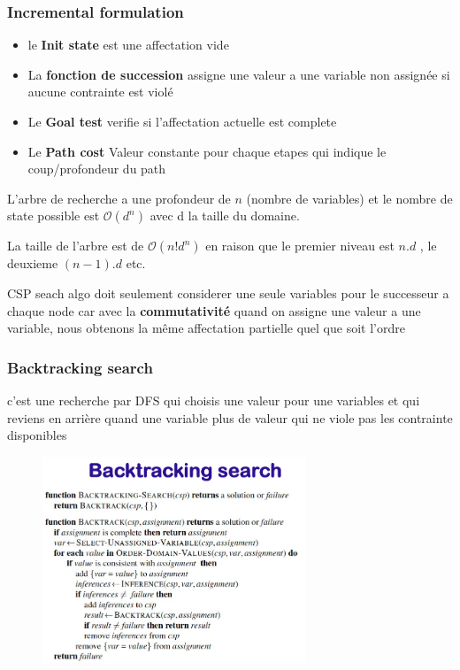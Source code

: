 		\subsubsection{Incremental formulation}
			\begin{itemize}
				\item le \textbf{Init state} est une affectation vide
				\item La \textbf{fonction de succession} assigne une valeur a une variable non assignée si aucune contrainte est violé
				\item Le \textbf{Goal test} verifie si l'affectation actuelle est complete
				\item Le \textbf{Path cost} Valeur constante pour chaque etapes qui indique le coup/profondeur du path
			\end{itemize}
			
			L'arbre de recherche a une profondeur de $n$ (nombre de variables) et le nombre de state possible est $\mathcal{O}(d^n)$ avec d la taille du domaine.
			
			La taille de l'arbre est de $\mathcal{O}(n! d^n)$ en raison que le premier niveau est $n.d$ , le deuxieme $(n-1).d$ etc.
			
			CSP seach algo doit seulement considerer une seule variables pour le successeur a chaque node car avec la \textbf{commutativité} quand on assigne une valeur a une variable, nous obtenons la même affectation partielle quel que soit l'ordre
			
		\subsubsection{Backtracking search}
			c'est une recherche par DFS qui choisis une valeur pour une variables et qui reviens en arrière quand une variable plus de valeur qui ne viole pas les contrainte disponibles
		
			\begin{figure}[htp]
				\centering
				\includegraphics[width=0.7\textwidth]{img/backtrackingSearch.png}

			\end{figure}
			
